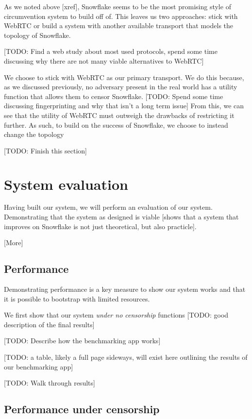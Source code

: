 \documentclass[12pt]{report}
\begin{document}
As we noted above [xref], Snowflake seems to be the most promising style of circumvention system to build off of. This leaves us two approaches: stick with WebRTC or build a system with another available transport that models the topology of Snowflake.

[TODO: Find a web study about most used protocols, spend some time discussing why there are not many viable alternatives to WebRTC]

We choose to stick with WebRTC as our primary transport. We do this because, as we discussed previously, no adversary present in the real world has a utility function that allows them to censor Snowflake. [TODO: Spend some time discussing fingerprinting and why that isn't a long term issue] From this, we can see that the utility of WebRTC must outweigh the drawbacks of restricting it further. As such, to build on the success of Snowflake, we choose to instead change the topology

[TODO: Finish this section]

\chapter{System evaluation}

Having built our system, we will perform an evaluation of our system. Demonstrating that the system as designed is viable [shows that a system that improves on Snowflake is not just theoretical, but also practicle].

[More]

\section{Performance}

Demonstrating performance is a key measure to show our system works and that it is possible to bootstrap with limited resources.

We first show that our system \emph{under no censorship} functions [TODO: good description of the final results]

[TODO: Describe how the benchmarking app works]

[TODO: a table, likely a full page sideways, will exist here outlining the results of our benchmarking app]

[TODO: Walk through results]

\section{Performance under censorship}
\end{document}
